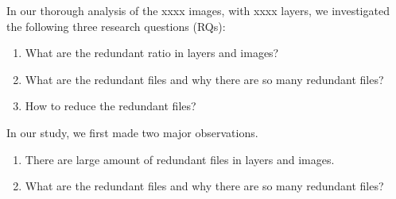 %
%

In our thorough analysis of the xxxx images, with xxxx layers, we investigated the following three research questions (RQs):

\begin{enumerate}
	\item What are the redundant ratio in layers and images?
	\item What are the redundant files and why there are so many redundant files?
	\item How to reduce the redundant files?
\end{enumerate}

In our study, we first made two major observations.
\begin{enumerate}
	\item There are large amount of redundant files in layers and images.
	\item What are the redundant files and why there are so many redundant files?
\end{enumerate}

